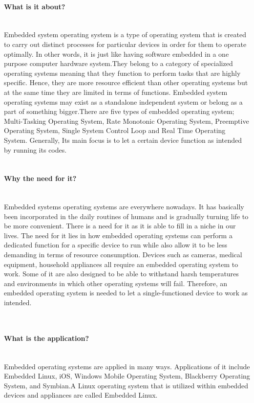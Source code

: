 \documentclass[conference]{IEEEtran}
\begin{document}
\paragraph{What is it about?}\mbox{} \\
Embedded system operating system is a type of operating system that is created to carry out distinct processes for particular devices in order for them to operate optimally. In other words, it is just like having software embedded in a one purpose computer hardware system.They belong to a category of specialized operating systems meaning that they function to perform tasks that are highly specific. Hence, they are more resource efficient than other operating systems but at the same time they are limited in terms of functions. Embedded system operating systems may exist as a standalone independent system or belong as a part of something bigger.There are five types of embedded operating system; Multi-Tasking Operating System, Rate Monotonic Operating System, Preemptive Operating System, Single System Control Loop and Real Time Operating System. Generally, Its main focus is to let a certain device function as intended by running its codes.\\

\\
\paragraph{Why the need for it?}\mbox{} \\
Embedded systems operating systems are everywhere nowadays. It has basically been incorporated in the daily routines of humans and is gradually turning life to be more convenient. There is a need for it as it is able to fill in a niche in our lives. The need for it lies in how embedded operating systems can perform a dedicated function for a specific device to run while also allow it to be less demanding in terms of resource consumption. Devices such as cameras, medical equipment, household appliances all require an embedded operating system to work. Some of it are also designed to be able to withstand harsh temperatures and environments in which other operating systems will fail. Therefore, an embedded operating system is needed to let a single-functioned device to work as intended.

\\
\paragraph{What is the application?}\mbox{} \\
Embedded operating systems are applied in many ways. Applications of it include Embedded Linux, iOS, Windows Mobile Operating System, Blackberry Operating System, and Symbian.A Linux operating system that is utilized within embedded devices and appliances are called Embedded Linux.
\end{document}
